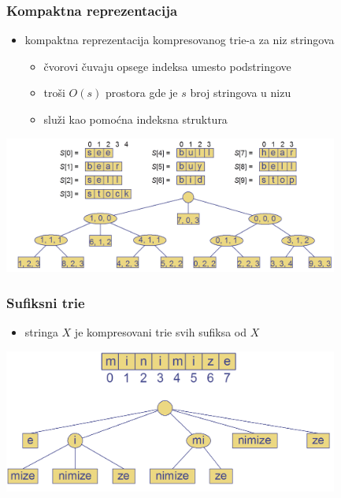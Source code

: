 \documentclass[compress]{beamer}
\begin{document}
\begin{frame}[fragile]
  \frametitle{Kompaktna reprezentacija}
  \begin{itemize}
    \item kompaktna reprezentacija kompresovanog trie-a za niz stringova
    \begin{itemize}
      \item čvorovi čuvaju opsege indeksa umesto podstringove
      \item troši $O(s)$ prostora gde je $s$ broj stringova u nizu
      \item služi kao pomoćna indeksna struktura
    \end{itemize}
  \end{itemize}
  \begin{center}
    \includegraphics[width=11cm]{asp-13-pic23.png}
  \end{center}
\end{frame}

\begin{frame}[fragile]
  \frametitle{Sufiksni trie}
  \begin{itemize}
    \item {} stringa $X$ je kompresovani trie svih sufiksa od $X$
  \end{itemize}
  \begin{center}
    \includegraphics[width=11cm]{asp-13-pic24.png}
  \end{center}
\end{frame}
\end{document}
